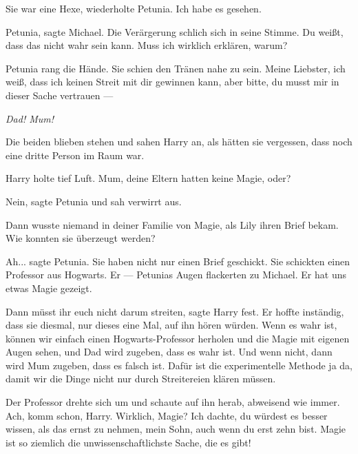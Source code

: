 \glqq{}Sie war eine Hexe\grqq{}, wiederholte Petunia. \glqq{}Ich habe es
gesehen.\grqq{}

\glqq{}Petunia\grqq{}, sagte Michael. Die Verärgerung schlich sich in seine
Stimme. \glqq{}Du weißt, dass das nicht wahr sein kann. Muss ich wirklich
erklären, warum?\grqq{}

Petunia rang die Hände. Sie schien den Tränen nahe zu sein. \glqq{}Meine
Liebster, ich weiß, dass ich keinen Streit mit dir gewinnen kann, aber bitte, du
musst mir in dieser Sache vertrauen ---\grqq{}

\glqq{}\emph{Dad! Mum!}\grqq{}

Die beiden blieben stehen und sahen Harry an, als hätten sie vergessen, dass
noch eine dritte Person im Raum war.

Harry holte tief Luft. \glqq{}Mum, deine Eltern hatten keine Magie, oder?\grqq{}

\glqq{}Nein\grqq{}, sagte Petunia und sah verwirrt aus.

\glqq{}Dann wusste niemand in deiner Familie von Magie, als Lily ihren Brief
bekam. Wie konnten sie überzeugt werden?\grqq{}

\glqq{}Ah...\grqq{} sagte Petunia. \glqq{}Sie haben nicht nur einen Brief
geschickt. Sie schickten einen Professor aus Hogwarts. Er ---\grqq{} Petunias
Augen flackerten zu Michael. \glqq{}Er hat uns etwas Magie gezeigt.\grqq{}

\glqq{}Dann müsst ihr euch nicht darum streiten\grqq{}, sagte Harry fest. Er
hoffte inständig, dass sie diesmal, nur dieses eine Mal, auf ihn hören würden.
\glqq{}Wenn es wahr ist, können wir einfach einen Hogwarts-Professor herholen und
die Magie mit eigenen Augen sehen, und Dad wird zugeben, dass es wahr ist. Und
wenn nicht, dann wird Mum zugeben, dass es falsch ist. Dafür ist die
experimentelle Methode ja da, damit wir die Dinge nicht nur durch Streitereien
klären müssen.\grqq{}

Der Professor drehte sich um und schaute auf ihn herab, abweisend wie immer.
\glqq{}Ach, komm schon, Harry. Wirklich, Magie? Ich dachte, du würdest es besser
wissen, als das ernst zu nehmen, mein Sohn, auch wenn du erst zehn bist. Magie
ist so ziemlich die unwissenschaftlichste Sache, die es gibt!\grqq{}

